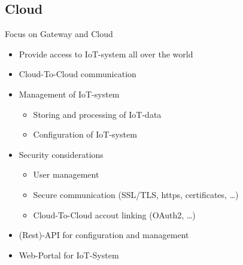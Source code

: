﻿\subsection{Cloud}

\begin{frame}{Focus on Gateway and Cloud}
  \begin{description}[Cloud]
    \item[Cloud]
    \begin{itemize}
      \item Provide access to IoT-system all over the world
      \item Cloud-To-Cloud communication
      \item Management of IoT-system
      \begin{itemize}
        \item Storing and processing of IoT-data
        \item Configuration of IoT-system
      \end{itemize}
      \item Security considerations
      \begin{itemize}
        \item User management
        \item Secure communication (SSL/TLS, https, certificates, \ldots)
        \item Cloud-To-Cloud accout linking (OAuth2, \ldots)
      \end{itemize}
      \item (Rest)-API for configuration and management
      \item Web-Portal for IoT-System
    \end{itemize}
  \end{description}
\end{frame}
